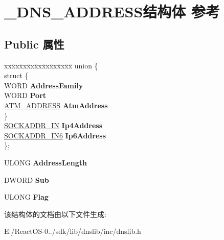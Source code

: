 \hypertarget{struct___d_n_s___a_d_d_r_e_s_s}{}\section{\+\_\+\+D\+N\+S\+\_\+\+A\+D\+D\+R\+E\+S\+S结构体 参考}
\label{struct___d_n_s___a_d_d_r_e_s_s}
\subsection*{Public 属性}
\begin{DoxyCompactItemize}
\item 
\mbox{\label{struct___d_n_s___a_d_d_r_e_s_s_a74c4d5d249c0ab1c99667d1bd99bab66}} 
\begin{tabbing}
xx\=xx\=xx\=xx\=xx\=xx\=xx\=xx\=xx\=\kill
union \{\\
\mbox{\label{union___d_n_s___a_d_d_r_e_s_s_1_1_0D3566_accb9a67a041696d3e0ea7640c8a95e07}} 
\>struct \{\\
\>\>WORD {\bfseries AddressFamily}\\
\>\>WORD {\bfseries Port}\\
\>\>\hyperlink{struct_a_t_m___a_d_d_r_e_s_s}{ATM\_ADDRESS} {\bfseries AtmAddress}\\
\>\} \\
\>\hyperlink{structsockaddr__in}{SOCKADDR\_IN} {\bfseries Ip4Address}\\
\>\hyperlink{structsockaddr__in6}{SOCKADDR\_IN6} {\bfseries Ip6Address}\\
\}; \\

\end{tabbing}\item 
\mbox{\label{struct___d_n_s___a_d_d_r_e_s_s_aa09356c836a9755ecabea86f85eaca3b}} 
U\+L\+O\+NG {\bfseries Address\+Length}
\item 
\mbox{\label{struct___d_n_s___a_d_d_r_e_s_s_af5b1ce4cdeff7dc9ab813c16396a55f7}} 
D\+W\+O\+RD {\bfseries Sub}
\item 
\mbox{\label{struct___d_n_s___a_d_d_r_e_s_s_aff640d08e92c97fc2da00a828af67d40}} 
U\+L\+O\+NG {\bfseries Flag}
\end{DoxyCompactItemize}


该结构体的文档由以下文件生成\+:\begin{DoxyCompactItemize}
\item 
E\+:/\+React\+O\+S-\/0../sdk/lib/dnslib/inc/dnslib.\+h\end{DoxyCompactItemize}
